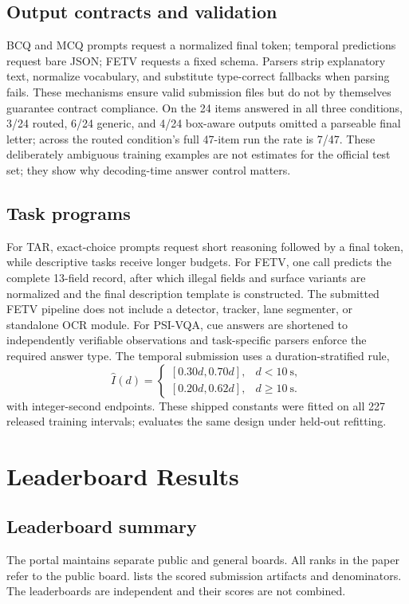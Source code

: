 \documentclass[runningheads]{llncs}
\begin{document}
\subsection{Output contracts and validation}
BCQ and MCQ prompts request a normalized final token; temporal predictions request bare JSON; FETV requests a fixed schema. Parsers strip explanatory text, normalize vocabulary, and substitute type-correct fallbacks when parsing fails. These mechanisms ensure valid submission files but do not by themselves guarantee contract compliance. On the 24 items answered in all three conditions, 3/24 routed, 6/24 generic, and 4/24 box-aware outputs omitted a parseable final letter; across the routed condition's full 47-item run the rate is 7/47. These deliberately ambiguous training examples are not estimates for the official test set; they show why decoding-time answer control matters.

\subsection{Task programs}
For TAR, exact-choice prompts request short reasoning followed by a final token, while descriptive tasks receive longer budgets. For FETV, one call predicts the complete 13-field record, after which illegal fields and surface variants are normalized and the final description template is constructed. The submitted FETV pipeline does not include a detector, tracker, lane segmenter, or standalone OCR module. For PSI-VQA, cue answers are shortened to independently verifiable observations and task-specific parsers enforce the required answer type. The temporal submission uses a duration-stratified rule,
\begin{equation}
\hat I(d)=\begin{cases}\left[0.30d,0.70d\right],&d<10\ \mathrm{s},\\ \left[0.20d,0.62d\right],&d\ge10\ \mathrm{s}.\end{cases}
\end{equation}
with integer-second endpoints. These shipped constants were fitted on all 227 released training intervals;  evaluates the same design under held-out refitting.

\section{Leaderboard Results}
\subsection{Leaderboard summary}
The portal maintains separate public and general boards. All ranks in the paper refer to the public board.  lists the scored submission artifacts and denominators. The leaderboards are independent and their scores are not combined.
\end{document}
